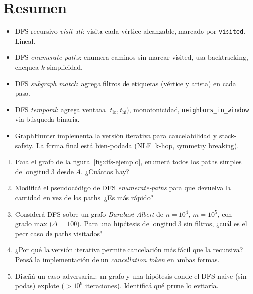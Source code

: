 \section{Resumen}

\begin{itemize}
    \item DFS recursivo \emph{visit-all}: visita cada vértice
    alcanzable, marcado por \texttt{visited}. Lineal.
    \item DFS \emph{enumerate-paths}: enumera caminos sin marcar
    visited, usa backtracking, chequea \(k\)-simplicidad.
    \item DFS \emph{subgraph match}: agrega filtros de etiquetas
    (vértice y arista) en cada paso.
    \item DFS \emph{temporal}: agrega ventana \([t_{\mathrm{lo}},
    t_{\mathrm{hi}})\), monotonicidad, \texttt{neighbors\_in\_window}
    via búsqueda binaria.
    \item GraphHunter implementa la versión iterativa para
    cancelabilidad y stack-safety. La forma final está
    bien-podada (NLF, k-hop, symmetry breaking).
\end{itemize}

\begin{ejercicios}
\begin{enumerate}
    \item \starred{} Para el grafo de la figura~\ref{fig:dfs-ejemplo},
    enumerá todos los paths simples de longitud 3 desde \(A\). ¿Cuántos
    hay?

    \item Modificá el pseudocódigo de DFS \emph{enumerate-paths}
    para que devuelva la cantidad en vez de los paths. ¿Es más rápido?

    \item \starred{} Considerá DFS sobre un grafo
    \emph{Barabasi-Albert} de \(n = 10^4\), \(m = 10^5\), con
    grado max ($\Delta = 100$). Para una hipótesis de longitud 3
    sin filtros, ¿cuál es el peor caso de paths visitados?

    \item ¿Por qué la versión iterativa permite cancelación más
    fácil que la recursiva? Pensá la implementación de un
    \emph{cancellation token} en ambas formas.

    \item Diseñá un caso adversarial: un grafo y una hipótesis donde
    el DFS naive (sin podas) explote (\(> 10^9\) iteraciones).
    Identificá qué prune lo evitaría.
\end{enumerate}
\end{ejercicios}
